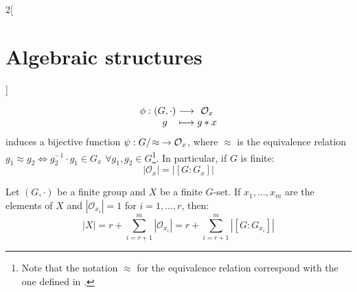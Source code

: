 \documentclass[../../../main_math.tex]{subfiles}
\begin{document}
\begin{multicols}{2}[\section{Algebraic structures}]
\begin{theorem}
    $$\function{\phi}{(G,\cdot)}{\mathcal{O}_x}{g}{g*x}$$
    induces a bijective function $\psi:\quot{G}{\!\approx}\;\rightarrow\mathcal{O}_x$, where $\approx$ is the equivalence relation $g_1\approx g_2\iff g_2^{-1}\cdot g_1\in G_x$ $\forall g_1,g_2\in G$\footnote{Note that the notation $\approx$ for the equivalence relation correspond with the one defined in .}. In particular, if $G$ is finite: $$|\mathcal{O}_x|=|[G:G_x]|$$
  \end{theorem}
  \begin{corollary}
    Let $(G,\cdot)$ be a finite group and $X$ be a finite $G$-set. If $x_1,\ldots,x_m$ are the elements of $X$ and $|\mathcal{O}_{x_i}|=1$ for $i=1,\ldots,r$, then:
    \begin{equation}
      |X|=r+\sum_{i=r+1}^m|\mathcal{O}_{x_i}|=r+\sum_{i=r+1}^m|[G:G_{x_i}]|
      \label{AS:obritsformula}
    \end{equation}
  \end{corollary}

\end{multicols}
\end{document}
